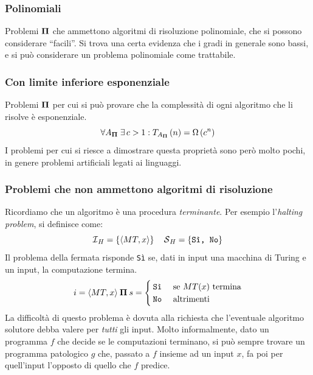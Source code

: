\subsubsection{Polinomiali}
Problemi $\bm{\Pi}{}$ che ammettono algoritmi di risoluzione polinomiale, che si possono considerare ``facili''. Si trova una certa evidenza
che i gradi in generale sono bassi, e si può considerare un problema polinomiale come trattabile.

\subsubsection{Con limite inferiore esponenziale}
Problemi $\bm{\Pi}{}$ per cui si può provare che la complessità di ogni algoritmo che li risolve è esponenziale.
\begin{equation*}
    \forall A_{\bm{\Pi}{}} \; \exists \, c > 1 : T_{A_{\bm{\Pi}{}}} \left( n \right) = \Omega \left( c^{n} \right)
\end{equation*}
I problemi per cui si riesce a dimostrare questa proprietà sono però molto pochi, in genere problemi artificiali legati ai linguaggi.

\subsubsection{Problemi che non ammettono algoritmi di risoluzione}
Ricordiamo che un algoritmo è una procedura \emph{terminante}. Per esempio l'\emph{halting problem}, si definisce come:
\begin{equation*}
    \mathcal{I}{}_{H} = \left\{ \langle MT,x \rangle \right\}
    \quad
    \mathcal{S}{}_{H} = \left\{ \texttt{Sì, No} \right\}
\end{equation*}
Il problema della fermata risponde \texttt{Sì} se, dati in input una macchina di Turing e un input, la computazione termina.
\begin{equation*}
    i = 
    \langle
    MT, x
    \rangle
    \:
    \bm{\Pi}
    \:
    s = 
    \begin{cases}
        \texttt{Sì} & \text{ se $MT(x)$ termina} \\
        \texttt{No} & \text{ altrimenti}
    \end{cases}
\end{equation*}
La difficoltà di questo problema è dovuta alla richiesta che l'eventuale algoritmo solutore debba valere per \emph{tutti} gli input.
Molto informalmente, dato un programma $f$ che decide se le computazioni terminano, si può sempre trovare un programma patologico $g$ che, passato a $f$ insieme ad un input $x$, fa poi per quell'input l'opposto di quello che $f$ predice.

